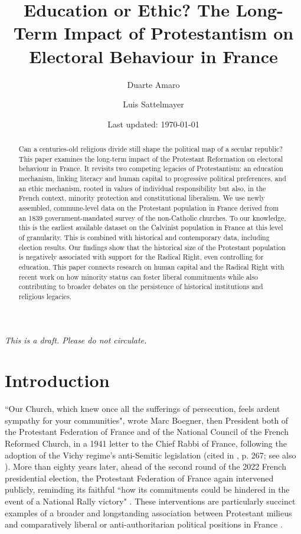 \documentclass[12pt]{article}
\title{Education or Ethic? The Long-Term Impact of Protestantism on Electoral Behaviour in France}
\author[1]{Duarte Amaro}
\author[2]{Luis Sattelmayer}
\affil[1]{Department of Politics and International Relations, University of Oxford}
\affil[2]{Department of Political Science, University of Innsbruck}
\date{\centering Last updated: \today %
}
\begin{document}
\maketitle

\centering \large \textit{This is a draft. Please do not circulate.} \bigskip

\justifying \normalsize

\begin{abstract}
    Can a centuries-old religious divide still shape the political map of a secular republic? This paper examines the long-term impact of the Protestant Reformation on electoral behaviour in France. It revisits two competing legacies of Protestantism: an education mechanism, linking literacy and human capital to progressive political preferences, and an ethic mechanism, rooted in values of individual responsibility but also, in the French context, minority protection and constitutional liberalism. We use newly assembled, commune-level data on the Protestant population in France derived from an 1839 government-mandated survey of the non-Catholic churches. To our knowledge, this is the earliest available dataset on the Calvinist population in France at this level of granularity. This is combined with historical and contemporary data, including election results. Our findings show that the historical size of the Protestant population is negatively associated with support for the Radical Right, even controlling for education. This paper connects research on human capital and the Radical Right with recent work on how minority status can foster liberal commitments while also contributing to broader debates on the persistence of historical institutions and religious legacies.
\end{abstract}

\clearpage
\section{Introduction}


\justifying

``Our Church, which knew once all the sufferings of persecution, feels ardent sympathy for your communities", wrote Marc Boegner, then President both of the Protestant Federation of France and of the National Council of the French Reformed Church, in a 1941 letter to the Chief Rabbi of France, following the adoption of the Vichy regime's anti-Semitic legislation (cited in \cite{leonardProtestantFrancais1955}, p. 267; see also \cite{cabanelMarcBoegnerOu2020}). 
More than eighty years later, ahead of the second round of the 2022 French presidential election, the Protestant Federation of France again intervened publicly, reminding its faithful ``how its commitments could be hindered in the event of a National Rally victory" \parencite{franceElectionsCommuniqueFPF2022}. These interventions are particularly succinct examples of a broader and longstanding association between Protestant milieus and comparatively liberal or anti-authoritarian political positions in France \parencite{latreilleForcesReligieusesVie1951, siegfriedGeographieElectoraleLArdeche1949}. 
\end{document}
